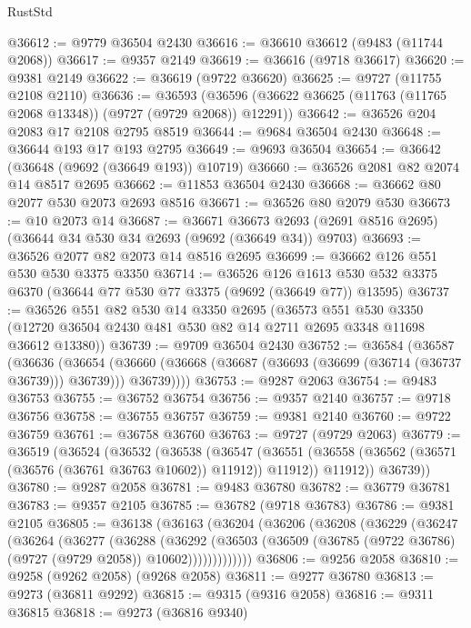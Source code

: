 \begin{lexlean}{RustStd}
\begin{coremodule}
@36612 := @9779 @36504 @2430
@36616 := @36610 @36612 (@9483 (@11744 @2068))
@36617 := @9357 @2149
@36619 := @36616 (@9718 @36617)
@36620 := @9381 @2149
@36622 := @36619 (@9722 @36620)
@36625 := @9727 (@11755 @2108 @2110)
@36636 := @36593
    (@36596 (@36622 @36625 (@11763 (@11765 @2068 @13348)) (@9727 (@9729 @2068)) @12291))
@36642 := @36526 @204 @2083 @17 @2108 @2795 @8519
@36644 := @9684 @36504 @2430
@36648 := @36644 @193 @17 @193 @2795
@36649 := @9693 @36504
@36654 := @36642 (@36648 (@9692 (@36649 @193)) @10719)
@36660 := @36526 @2081 @82 @2074 @14 @8517 @2695
@36662 := @11853 @36504 @2430
@36668 := @36662 @80 @2077 @530 @2073 @2693 @8516
@36671 := @36526 @80 @2079 @530
@36673 := @10 @2073 @14
@36687 := @36671
    @36673
    @2693
    (@2691 @8516 @2695)
    (@36644 @34 @530 @34 @2693 (@9692 (@36649 @34)) @9703)
@36693 := @36526 @2077 @82 @2073 @14 @8516 @2695
@36699 := @36662 @126 @551 @530 @530 @3375 @3350
@36714 := @36526
    @126
    @1613
    @530
    @532
    @3375
    @6370
    (@36644 @77 @530 @77 @3375 (@9692 (@36649 @77)) @13595)
@36737 := @36526
    @551
    @82
    @530
    @14
    @3350
    @2695
    (@36573
      @551
      @530
      @3350
      (@12720 @36504 @2430 @481 @530 @82 @14 @2711 @2695 @3348 @11698 @36612 @13380))
@36739 := @9709 @36504 @2430
@36752 := @36584
    (@36587
      (@36636
        (@36654
          (@36660 (@36668 (@36687 (@36693 (@36699 (@36714 (@36737 @36739))) @36739))) @36739))))
@36753 := @9287 @2063
@36754 := @9483 @36753
@36755 := @36752 @36754
@36756 := @9357 @2140
@36757 := @9718 @36756
@36758 := @36755 @36757
@36759 := @9381 @2140
@36760 := @9722 @36759
@36761 := @36758 @36760
@36763 := @9727 (@9729 @2063)
@36779 := @36519
    (@36524
      (@36532
        (@36538
          (@36547
            (@36551 (@36558 (@36562 (@36571 (@36576 (@36761 @36763 @10602)) @11912)) @11912))
            @11912))
        @36739))
@36780 := @9287 @2058
@36781 := @9483 @36780
@36782 := @36779 @36781
@36783 := @9357 @2105
@36785 := @36782 (@9718 @36783)
@36786 := @9381 @2105
@36805 := @36138
    (@36163
      (@36204
        (@36206
          (@36208
            (@36229
              (@36247
                (@36264
                  (@36277
                    (@36288
                      (@36292
                        (@36503
                          (@36509 (@36785 (@9722 @36786) (@9727 (@9729 @2058)) @10602)))))))))))))
@36806 := @9256 @2058
@36810 := @9258 (@9262 @2058) (@9268 @2058)
@36811 := @9277 @36780
@36813 := @9273 (@36811 @9292)
@36815 := @9315 (@9316 @2058)
@36816 := @9311 @36815
@36818 := @9273 (@36816 @9340)

\end{coremodule}
\end{lexlean}
